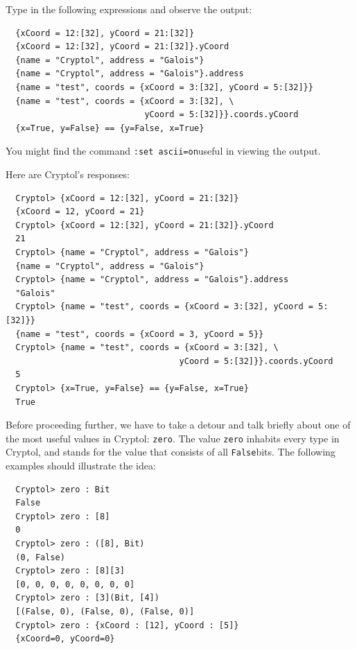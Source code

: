 \begin{Exercise}\label{ex:record:1}
Type in the following expressions and observe the output:
\begin{Verbatim}
  {xCoord = 12:[32], yCoord = 21:[32]}
  {xCoord = 12:[32], yCoord = 21:[32]}.yCoord
  {name = "Cryptol", address = "Galois"}
  {name = "Cryptol", address = "Galois"}.address
  {name = "test", coords = {xCoord = 3:[32], yCoord = 5:[32]}}
  {name = "test", coords = {xCoord = 3:[32], \
                            yCoord = 5:[32]}}.coords.yCoord
  {x=True, y=False} == {y=False, x=True}
\end{Verbatim}
\noindent You might find the command {\tt :set
  ascii=on}\indSettingASCII useful in viewing the output.
\end{Exercise}
\begin{Answer}
Here are Cryptol's responses:
\begin{small}
\begin{Verbatim}
  Cryptol> {xCoord = 12:[32], yCoord = 21:[32]}
  {xCoord = 12, yCoord = 21}
  Cryptol> {xCoord = 12:[32], yCoord = 21:[32]}.yCoord
  21
  Cryptol> {name = "Cryptol", address = "Galois"}
  {name = "Cryptol", address = "Galois"}
  Cryptol> {name = "Cryptol", address = "Galois"}.address
  "Galois"
  Cryptol> {name = "test", coords = {xCoord = 3:[32], yCoord = 5:[32]}}
  {name = "test", coords = {xCoord = 3, yCoord = 5}}
  Cryptol> {name = "test", coords = {xCoord = 3:[32], \
                                   yCoord = 5:[32]}}.coords.yCoord
  5
  Cryptol> {x=True, y=False} == {y=False, x=True}
  True
\end{Verbatim}
\end{small}
\end{Answer}


Before proceeding further, we have to take a detour and talk briefly
about one of the most useful values in Cryptol: {\tt zero}.\indZero
The value {\tt zero} inhabits every type in Cryptol, and stands for
the value that consists of all {\tt False}\indFalse bits. The
following examples should illustrate the idea:
\begin{Verbatim}
  Cryptol> zero : Bit
  False
  Cryptol> zero : [8]
  0
  Cryptol> zero : ([8], Bit)
  (0, False)
  Cryptol> zero : [8][3]
  [0, 0, 0, 0, 0, 0, 0, 0]
  Cryptol> zero : [3](Bit, [4])
  [(False, 0), (False, 0), (False, 0)]
  Cryptol> zero : {xCoord : [12], yCoord : [5]}
  {xCoord=0, yCoord=0}
\end{Verbatim}

